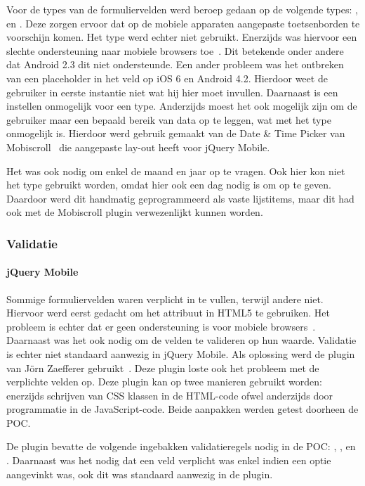 Voor de types van de formuliervelden werd beroep gedaan op de volgende types: ,  en . Deze zorgen ervoor dat op de mobiele apparaten aangepaste toetsenborden te voorschijn komen. Het  type werd echter niet gebruikt. Enerzijds was hiervoor een slechte ondersteuning naar mobiele browsers toe~\cite{Deveria2013b}. Dit betekende onder andere dat Android 2.3 dit niet ondersteunde. Een ander probleem was het ontbreken van een placeholder in het veld op iOS 6 en Android 4.2. Hierdoor weet de gebruiker in eerste instantie niet wat hij hier moet invullen. Daarnaast is een  instellen onmogelijk voor een  type. Anderzijds moest het ook mogelijk zijn om de gebruiker maar een bepaald bereik van data op te leggen, wat met het  type onmogelijk is. Hierdoor werd gebruik gemaakt van de Date \& Time Picker van Mobiscroll~\cite{Mobiscroll2013} die aangepaste lay-out heeft voor jQuery Mobile.

Het was ook nodig om enkel de maand en jaar op te vragen. Ook hier kon niet het  type gebruikt worden, omdat hier ook een dag nodig is om op te geven. Daardoor werd dit handmatig geprogrammeerd als vaste lijstitems, maar dit had ook met de Mobiscroll plugin verwezenlijkt kunnen worden.

\subsubsection{Validatie}

\paragraph{jQuery Mobile} 
Sommige formuliervelden waren verplicht in te vullen, terwijl andere niet. Hiervoor werd eerst gedacht om het  attribuut in HTML5 te gebruiken. Het probleem is echter dat er geen ondersteuning is voor mobiele browsers~\cite{Deveria2013}. Daarnaast was het ook nodig om de velden te valideren op hun waarde. Validatie is echter niet standaard aanwezig in jQuery Mobile. Als oplossing werd de plugin van Jörn Zaefferer gebruikt~\cite{Zaefferer2013}. Deze plugin loste ook het probleem met de verplichte velden op. Deze plugin kan op twee manieren gebruikt worden: enerzijds schrijven van CSS klassen in de HTML-code ofwel anderzijds door programmatie in de JavaScript-code. Beide aanpakken werden getest doorheen de POC. 

De plugin bevatte de volgende ingebakken validatieregels nodig in de POC: , ,  en .
Daarnaast was het nodig dat een veld verplicht was enkel indien een optie aangevinkt was, ook dit was standaard aanwezig in de plugin.

